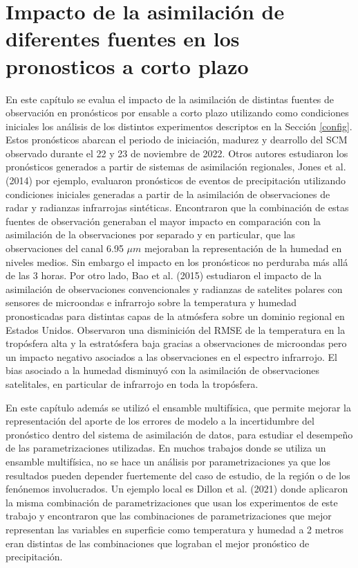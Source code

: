 \documentclass[12pt,oneside,a4paper]{reedthesis}
\begin{document}
\hypertarget{cap-4-pronosticos}{%
\chapter{Impacto de la asimilación de diferentes fuentes en los pronosticos a corto plazo}\label{cap-4-pronosticos}}

En este capítulo se evalua el impacto de la asimilación de distintas fuentes de observación en pronósticos por ensable a corto plazo utilizando como condiciones iniciales los análisis de los distintos experimentos descriptos en la Sección \ref{config}. Estos pronósticos abarcan el periodo de iniciación, madurez y dearrollo del SCM observado durante el 22 y 23 de noviembre de 2022. Otros autores estudiaron los pronósticos generados a partir de sistemas de asimilación regionales, Jones et al. (2014) por ejemplo, evaluaron pronósticos de eventos de precipitación utilizando condiciones iniciales generadas a partir de la asimilación de observaciones de radar y radianzas infrarrojas sintéticas. Encontraron que la combinación de estas fuentes de observación generaban el mayor impacto en comparación con la asimilación de la observaciones por separado y en particular, que las observaciones del canal 6.95 \(\mu m\) mejoraban la representación de la humedad en niveles medios. Sin embargo el impacto en los pronósticos no perduraba más allá de las 3 horas. Por otro lado, Bao et al. (2015) estudiaron el impacto de la asimilación de observaciones convencionales y radianzas de satelites polares con sensores de microondas e infrarrojo sobre la temperatura y humedad pronosticadas para distintas capas de la atmósfera sobre un dominio regional en Estados Unidos. Observaron una disminición del RMSE de la temperatura en la tropósfera alta y la estratósfera baja gracias a observaciones de microondas pero un impacto negativo asociados a las observaciones en el espectro infrarrojo. El bias asociado a la humedad disminuyó con la asimilación de observaciones satelitales, en particular de infrarrojo en toda la tropósfera.

En este capítulo además se utilizó el ensamble multifísica, que permite mejorar la representación del aporte de los errores de modelo a la incertidumbre del pronóstico dentro del sistema de asimilación de datos, para estudiar el desempeño de las parametrizaciones utilizadas. En muchos trabajos donde se utiliza un ensamble multifísica, no se hace un análisis por parametrizaciones ya que los resultados pueden depender fuertemente del caso de estudio, de la región o de los fenónemos involucrados. Un ejemplo local es Dillon et al. (2021) donde aplicaron la misma combinación de parametrizaciones que usan los experimentos de este trabajo y encontraron que las combinaciones de parametrizaciones que mejor representan las variables en superficie como temperatura y humedad a 2 metros eran distintas de las combinaciones que lograban el mejor pronóstico de precipitación.
\end{document}
